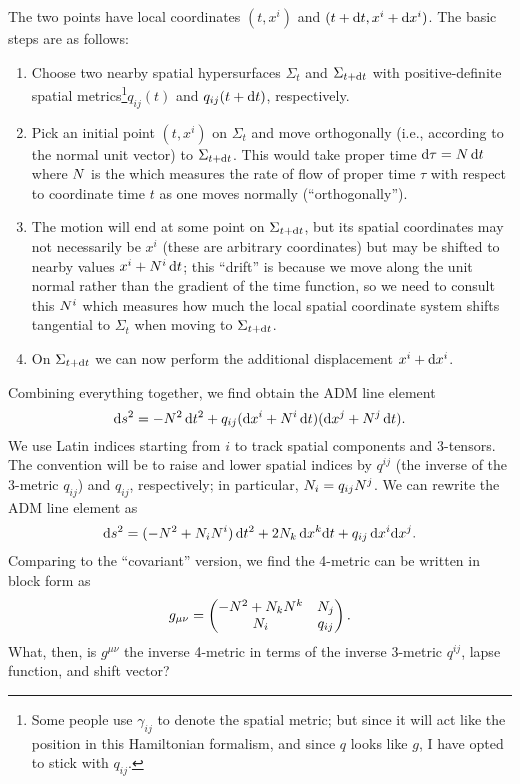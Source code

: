 The two points have local coordinates $(t,x^{i})$ and $(t+\mathrm{d} t, x^{i} + \mathrm{d} x^{i})$.
The basic steps are as follows:
\begin{enumerate}
\item Choose two nearby spatial hypersurfaces $\Sigma_{t}$ and
  $\Sigma_{t+\mathrm{d} t}$ with positive-definite spatial metrics\footnote{Some
people use $\gamma_{ij}$ to denote the spatial metric; but since it will
act like the position in this Hamiltonian formalism, and since $q$ looks
like $g$, I have opted to stick with $q_{ij}$.}$q_{ij}(t)$
  and $q_{ij}(t + \mathrm{d} t)$, respectively.
\item Pick an initial point $(t, x^{i})$ on $\Sigma_{t}$ and move
  orthogonally (i.e., according to the normal unit vector) to
  $\Sigma_{t+\mathrm{d} t}$. This would take proper time $\mathrm{d}\tau=N\,\mathrm{d} t$ where
  $N$ is the  which measures the rate of flow of
  proper time $\tau$ with respect to coordinate time $t$ as one moves
  normally (``orthogonally'').
\item The motion will end at some point on $\Sigma_{t + \mathrm{d} t}$, but its
  spatial coordinates may not necessarily be $x^{i}$ (these are
  arbitrary coordinates) but may be shifted to nearby values
  $x^{i}+N^{i}\,\mathrm{d} t$; this ``drift'' is because we move along the unit
  normal rather than the gradient of the time function, so we need to
  consult this  $N^{i}$ which measures how much the
  local spatial coordinate system shifts tangential to $\Sigma_{t}$ when
  moving to $\Sigma_{t + \mathrm{d} t}$.
\item On $\Sigma_{t+\mathrm{d} t}$ we can now perform the additional
  displacement $x^{i} + \mathrm{d} x^{i}$.
\end{enumerate}
Combining everything together, we find obtain the ADM line element
\begin{equation}
\mathrm{d} s^{2} = -N^{2}\,\mathrm{d} t^{2}
  + q_{ij}(\mathrm{d} x^{i} + N^{i}\,\mathrm{d} t)(\mathrm{d} x^{j} + N^{j}\,\mathrm{d} t).
\end{equation}
We use Latin indices starting from $i$ to track spatial components and
3-tensors. The convention will be to raise and lower spatial indices by
$q^{ij}$ (the inverse of the 3-metric $q_{ij}$) and $q_{ij}$, respectively; in particular, $N_{i}=q_{ij}N^{j}$.
We can rewrite the ADM line element as
\begin{equation}\label{eq:cauchy-surface:adm-line-element}
  \mathrm{d} s^{2} = (-N^{2} + N_{i}N^{i})\,\mathrm{d} t^{2}
  + 2 N_{k}\,\mathrm{d} x^{k}\mathrm{d} t
  + q_{ij}\,\mathrm{d} x^{i}\mathrm{d} x^{j}.
\end{equation}
Comparing to the ``covariant'' version, we find the 4-metric can be
written in block form as
\begin{equation}
  g_{\mu\nu} = \begin{pmatrix}
    -N^{2} + N_{k}N^{k} & N_{j}\\
    N_{i} & q_{ij}
\end{pmatrix}.
\end{equation}
What, then, is $g^{\mu\nu}$ the inverse 4-metric in terms of the
inverse 3-metric $q^{ij}$, lapse function, and shift vector?

